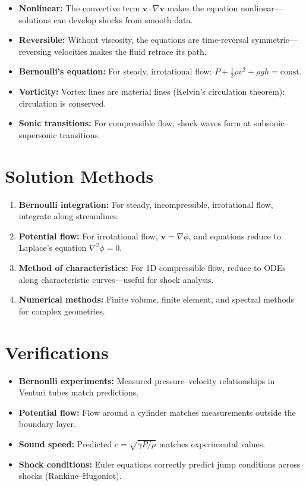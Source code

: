 \documentclass[11pt,openright]{book}
\begin{document}
\begin{itemize}
\item \textbf{Nonlinear:} The convective term $\mathbf{v} \cdot \nabla \mathbf{v}$ makes the equation nonlinear---solutions can develop shocks from smooth data.
\item \textbf{Reversible:} Without viscosity, the equations are time-reversal symmetric---reversing velocities makes the fluid retrace its path.
\item \textbf{Bernoulli's equation:} For steady, irrotational flow: $P + \frac{1}{2}\rho v^2 + \rho gh = \text{const}$.
\item \textbf{Vorticity:} Vortex lines are material lines (Kelvin's circulation theorem): circulation is conserved.
\item \textbf{Sonic transitions:} For compressible flow, shock waves form at subsonic--supersonic transitions.
\end{itemize}
\section*{Solution Methods}

\begin{enumerate}
\item \textbf{Bernoulli integration:} For steady, incompressible, irrotational flow, integrate along streamlines.
\item \textbf{Potential flow:} For irrotational flow, $\mathbf{v} = \nabla\phi$, and equations reduce to Laplace's equation $\nabla^2 \phi = 0$.
\item \textbf{Method of characteristics:} For 1D compressible flow, reduce to ODEs along characteristic curves---useful for shock analysis.
\item \textbf{Numerical methods:} Finite volume, finite element, and spectral methods for complex geometries.
\end{enumerate}
\section*{Verifications}

\begin{itemize}
\item \textbf{Bernoulli experiments:} Measured pressure--velocity relationships in Venturi tubes match predictions.
\item \textbf{Potential flow:} Flow around a cylinder matches measurements outside the boundary layer.
\item \textbf{Sound speed:} Predicted $c = \sqrt{\gamma P / \rho}$ matches experimental values.
\item \textbf{Shock conditions:} Euler equations correctly predict jump conditions across shocks (Rankine--Hugoniot).
\end{itemize}
\end{document}
